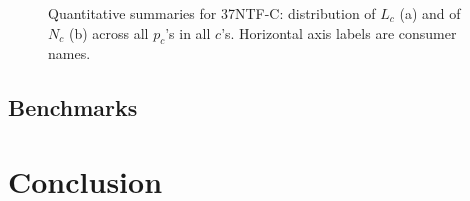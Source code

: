 \documentclass[journal, a4paper]{IEEEtran}
\begin{document}
\begin{figure}[t!]
	\centering
	\caption{
		Quantitative summaries for 37NTF-C:
		distribution of $L_{c}$ (a) and of $N_{c}$ (b)
		across all $p_{c}$'s in all $c$'s.
		Horizontal axis labels are consumer names.
	}
	\label{fig: Quantitative summaries for 37NTF-C}
\end{figure}

\subsection{Benchmarks}
\label{subsec: III. Benchmarks}

\lipsum[8]

\section{Conclusion}
\label{sec: Conclusion}

\lipsum[28]





\end{document}
